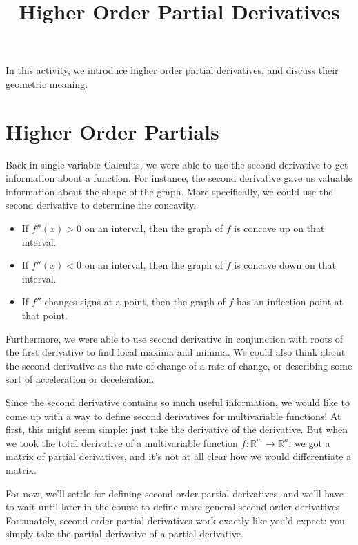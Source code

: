 \documentclass{ximera}
\title{Higher Order Partial Derivatives}
\begin{document}
\begin{abstract}
\end{abstract}
\maketitle

In this activity, we introduce higher order partial derivatives, and discuss their geometric meaning.

\section{Higher Order Partials}

Back in single variable Calculus, we were able to use the second derivative to get information about a function. For instance, the second derivative gave us valuable information about the shape of the graph. More specifically, we could use the second derivative to determine the concavity.
\begin{itemize}
\item If $f''(x)>0$ on an interval, then the graph of $f$ is concave up on that interval.
\item If $f''(x)<0$ on an interval, then the graph of $f$ is concave down on that interval.
\item If $f''$ changes signs at a point, then the graph of $f$ has an inflection point at that point.
\end{itemize}
Furthermore, we were able to use second derivative in conjunction with roots of the first derivative to find local maxima and minima. We could also think about the second derivative as the rate-of-change of a rate-of-change, or describing some sort of acceleration or deceleration.

Since the second derivative contains so much useful information, we would like to come up with a way to define second derivatives for multivariable functions! At first, this might seem simple: just take the derivative of the derivative. But when we took the total derivative of a multivariable function $f:\mathbb{R}^m\rightarrow\mathbb{R}^n$, we got a matrix of partial derivatives, and it's not at all clear how we would differentiate a matrix.

For now, we'll settle for defining second order partial derivatives, and we'll have to wait until later in the course to define more general second order derivatives. Fortunately, second order partial derivatives work exactly like you'd expect: you simply take the partial derivative of a partial derivative.
\end{document}
